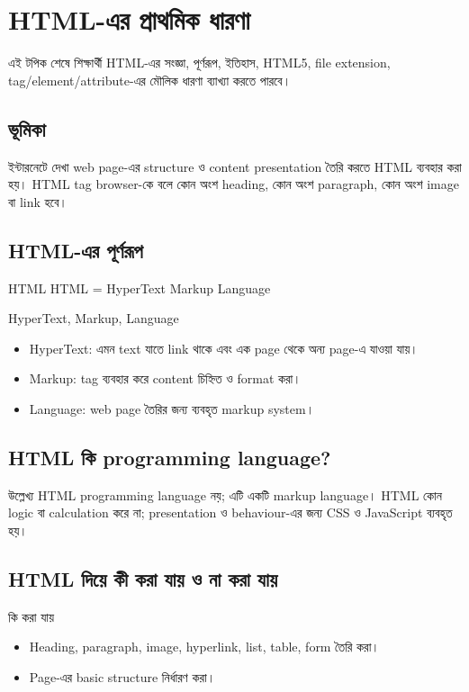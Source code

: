 \section{HTML-এর প্রাথমিক ধারণা}

\begin{learningbox}
এই টপিক শেষে শিক্ষার্থী HTML-এর সংজ্ঞা, পূর্ণরূপ, ইতিহাস, HTML5, file extension, tag/element/attribute-এর মৌলিক ধারণা ব্যাখ্যা করতে পারবে।
\end{learningbox}

\subsection{ভূমিকা}
ইন্টারনেটে দেখা web page-এর structure ও content presentation তৈরি করতে HTML ব্যবহার করা হয়। HTML tag browser-কে বলে কোন অংশ heading, কোন অংশ paragraph, কোন অংশ image বা link হবে।

\subsection{HTML-এর পূর্ণরূপ}
\begin{definitionbox}{HTML}
HTML = HyperText Markup Language
\end{definitionbox}

\begin{keypointbox}{HyperText, Markup, Language}
\begin{itemize}
\item HyperText: এমন text যাতে link থাকে এবং এক page থেকে অন্য page-এ যাওয়া যায়।
\item Markup: tag ব্যবহার করে content চিহ্নিত ও format করা।
\item Language: web page তৈরির জন্য ব্যবহৃত markup system।
\end{itemize}
\end{keypointbox}

\subsection{HTML কি programming language?}
\begin{mistakebox}{উল্লেখ্য}
HTML programming language নয়; এটি একটি markup language। HTML কোন logic বা calculation করে না; presentation ও behaviour-এর জন্য CSS ও JavaScript ব্যবহৃত হয়।
\end{mistakebox}

\subsection{HTML দিয়ে কী করা যায় ও না করা যায়}
\begin{keypointbox}{কি করা যায়}
\begin{itemize}
\item Heading, paragraph, image, hyperlink, list, table, form তৈরি করা।
\item Page-এর basic structure নির্ধারণ করা।
\end{itemize}
\end{keypointbox}

